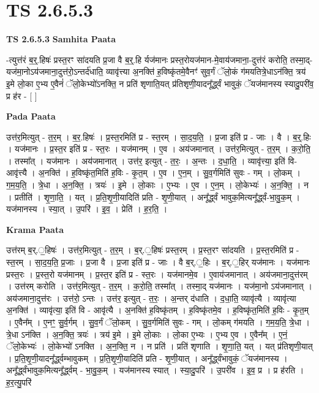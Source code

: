 \documentclass[17pt]{extarticle}
\begin{document}
\section{ TS 2.6.5.3 }

\textbf{TS 2.6.5.3 } \newline
\textbf{Samhita Paata} \newline

-त्युत्त॑रं ब॒र्॒.हिषः॑ प्रस्त॒रꣳ सा॑दयति प्र॒जा वै ब॒र्॒.हि र्यज॑मानः प्रस्त॒रोयज॑मान-मे॒वाय॑जमाना॒-दुत्त॑रं करोति॒ तस्मा॒द्-यज॑मा॒नोऽय॑जमाना॒दुत्त॑रो॒ऽन्तर्द॑धाति॒ व्यावृ॑त्त्या अ॒नक्ति॑ ह॒विष्कृ॑तमे॒वैनꣳ॑ सुव॒र्गं ॅलो॒कं ग॑मयतित्रे॒धाऽन॑क्ति॒ त्रय॑ इ॒मे लो॒का ए॒भ्य ए॒वैनं॑ ॅलो॒केभ्यो॑ऽनक्ति॒ न प्रति॑ शृणाति॒यत् प्र॑तिशृणी॒यादनू᳚र्द्ध्वं भावुकं॒ ॅयज॑मानस्य स्यादु॒परी॑व॒ प्र ह॑र - [  ] \newline

\textbf{Pada Paata} \newline

उत्त॑र॒मित्युत् - त॒र॒म् । ब॒र॒.हिषः॑ । प्र॒स्त॒रमिति॑ प्र - स्त॒रम् । सा॒द॒य॒ति॒ । प्र॒जा इति॑ प्र - जाः । वै । ब॒र्॒.हिः । यज॑मानः । प्र॒स्त॒र इति॑ प्र - स्त॒रः । यज॑मानम् । ए॒व । अय॑जमानात् । उत्त॑र॒मित्युत् - त॒र॒म् । क॒रो॒ति॒ । तस्मा᳚त् । यज॑मानः । अय॑जमानात् । उत्त॑र॒ इत्युत् - त॒रः॒ । अ॒न्तः । द॒धा॒ति॒ । व्यावृ॑त्त्या॒ इति॑ वि-आवृ॑त्त्यै । अ॒नक्ति॑ । ह॒विष्कृ॑त॒मिति॑ ह॒विः - कृ॒त॒म् । ए॒व । ए॒न॒म् । सु॒व॒र्गमिति॑ सुवः - गम् । लो॒कम् । ग॒म॒य॒ति॒ । त्रे॒धा । अ॒न॒क्ति॒ । त्रयः॑ । इ॒मे । लो॒काः । ए॒भ्यः । ए॒व । ए॒न॒म् । लो॒केभ्यः॑ । अ॒न॒क्ति॒ । न । प्रतीति॑ । शृ॒णा॒ति॒ । यत् । प्र॒ति॒शृ॒णी॒यादिति॑ प्रति - शृ॒णी॒यात् । अनू᳚र्द्ध्वं भावुक॒मित्यनू᳚र्द्ध्वं-भा॒वु॒क॒म् । यज॑मानस्य । स्या॒त् । उ॒परि॑ । इ॒व॒ । प्रेति॑ । ह॒र॒ति॒ ।  \newline


\textbf{Krama Paata} \newline

उत्त॑रम् ब॒र्.॒हिषः॑ । उत्त॑र॒मित्युत् - त॒र॒म् । ब॒र्.॒हिषः॑ प्रस्त॒रम् । प्र॒स्त॒रꣳ सा॑दयति । प्र॒स्त॒रमिति॑ प्र - स्त॒रम् । सा॒द॒य॒ति॒ प्र॒जाः । प्र॒जा वै । प्र॒जा इति॑ प्र - जाः । वै ब॒र्.॒हिः । ब॒र्.॒हिर् यज॑मानः । यज॑मानः प्रस्त॒रः । प्र॒स्त॒रो यज॑मानम् । प्र॒स्त॒र इति॑ प्र - स्त॒रः । यज॑मानमे॒व । ए॒वाय॑जमानात् । अय॑जमाना॒दुत्त॑रम् । उत्त॑रम् करोति । उत्त॑र॒मित्युत् - त॒र॒म् । क॒रो॒ति॒ तस्मा᳚त् । तस्मा॒द् यज॑मानः । यज॑मा॒नो ऽय॑जमानात् । अय॑जमाना॒दुत्त॑रः । उत्त॑रो॒ ऽन्तः । उत्त॑र॒ इत्युत् - त॒रः॒ । अ॒न्तर् द॑धाति । द॒धा॒ति॒ व्यावृ॑त्यै । व्यावृ॑त्या अ॒नक्ति॑ । व्यावृ॑त्या॒ इति॑ वि - आवृ॑त्यै । अ॒नक्ति॑ ह॒विष्कृ॑तम् । ह॒विष्कृ॑तमे॒व । ह॒विष्कृ॑त॒मिति॑ ह॒विः - कृ॒त॒म् । ए॒वैन᳚म् । ए॒नꣳ॒॒ सु॒र्व॒र्गम् । सु॒व॒र्गं ॅलो॒कम् । सु॒व॒र्गमिति॑ सुवः - गम् । लो॒कम् ग॑मयति । ग॒म॒य॒ति॒ त्रे॒धा । त्रे॒धा ऽन॑क्ति । अ॒न॒क्ति॒ त्रयः॑ । त्रय॑ इ॒मे । इ॒मे लो॒काः । लो॒का ए॒भ्यः । ए॒भ्य ए॒व । ए॒वैन᳚म् । ए॒नं॒ ॅलो॒केभ्यः॑ । लो॒केभ्यो॑ ऽनक्ति । अ॒न॒क्ति॒ न । न प्रति॑ । प्रति॑ शृणाति । शृ॒णा॒ति॒ यत् । यत् प्र॑तिशृणी॒यात् । प्र॒ति॒शृ॒णी॒यादनू᳚र्द्ध्वम्भावुकम् । प्र॒ति॒शृ॒णी॒यादिति॑ प्रति - शृ॒णी॒यात् । अनू᳚र्द्ध्वंभावुकं॒ ॅयज॑मानस्य । अनू᳚र्द्ध्वंभावुक॒मित्यनू᳚र्द्ध्वम् - भा॒वु॒क॒म् । यज॑मानस्य स्यात् । स्या॒दु॒परि॑ । उ॒परी॑व । इ॒व॒ प्र । प्र ह॑रति । ह॒र॒त्यु॒परि॑ \newline
\end{document}
